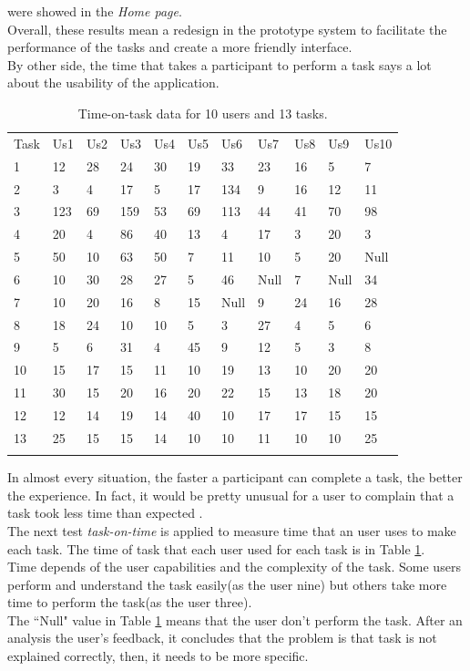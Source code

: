 were showed in the \textit{Home page}.\\ 
Overall, these results mean a redesign in the
prototype system to facilitate the performance of the tasks 
and create a more friendly interface.\\ 
By other side, the time that takes a participant to perform a task
says a lot about the usability of the application. 
\begin{table}
\centering
\small
\captionsetup{font=footnotesize}
\caption{Time-on-task data for 10 users and 13 tasks.}
\label{tab:datausers}  
\begin{tabular}{lllllllllll}
\hline\noalign{\smallskip}
Task  & Us1  & Us2 & Us3 & Us4 & Us5 & Us6 & Us7 & Us8 & Us9 & Us10 \\
\noalign{\smallskip}\hline\noalign{\smallskip}
1 & 12  & 28 & 24 & 30 & 19 & 33  & 23 & 16 & 5  & 7 \\
2 & 3   & 4  & 17 & 5  & 17 & 134 & 9  & 16 & 12 & 11 \\
3 & 123 & 69 & 159& 53 & 69 & 113 & 44 & 41 & 70 & 98 \\
4 & 20  & 4  & 86 & 40 & 13 & 4   & 17 & 3  & 20 & 3 \\
5 & 50  & 10 & 63 & 50 & 7  & 11  & 10 & 5  & 20 & Null \\
6 & 10  & 30 & 28 & 27 & 5  & 46  & Null  & 7  & Null  & 34 \\
7 & 10  & 20 & 16 & 8  & 15 & Null & 9  & 24 & 16 & 28 \\
8 & 18  & 24 & 10 & 10 & 5  & 3   & 27 & 4  & 5  & 6 \\
9 & 5   & 6  & 31 & 4  & 45 & 9   & 12 & 5  & 3  & 8 \\
10 & 15 & 17 & 15 & 11 & 10 & 19  & 13 & 10 & 20 & 20 \\
11 & 30 & 15 & 20 & 16 & 20 & 22  & 15 & 13 & 18 & 20 \\
12 & 12 & 14 & 19 & 14 & 40 & 10  & 17 & 17 & 15 & 15 \\
13 & 25 & 15 & 15 & 14 & 10 & 10  & 11 & 10 & 10 & 25 \\
\noalign{\smallskip}\hline
\end{tabular}
\end{table}
In almost every
situation, the faster a participant can complete a task, the better
the experience. In fact, it would be pretty unusual for a user to
complain that a task took less time than
expected  \cite{albert2013measuring}.\\  The next test 
\textit{task-on-time} is applied to measure time that an user 
uses to make each task.
The time of task that each user used for each task is in Table
 \ref{tab:datausers}. \\Time depends of the user capabilities and the
complexity of the task. Some users perform and understand the task
easily(as the user nine) but others take more time to perform the task(as
the user three). \\The ``Null" value in Table  \ref{tab:datausers} means that
the user don't perform the task. After an analysis the user's
feedback, it concludes that the problem is that task is not explained
correctly, then, it needs to be more specific.

